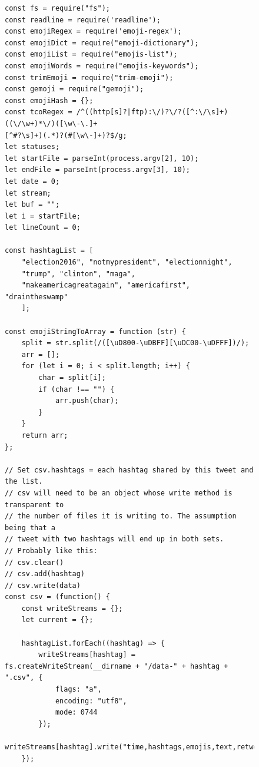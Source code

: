 \documentclass[prodmode]{acmsmall} %
\begin{document}
\begin{figure}[!t]
    \begin{lstlisting}
const fs = require("fs");
const readline = require('readline');
const emojiRegex = require('emoji-regex');
const emojiDict = require("emoji-dictionary");
const emojiList = require("emojis-list");
const emojiWords = require("emojis-keywords");
const trimEmoji = require("trim-emoji");
const gemoji = require("gemoji");
const emojiHash = {};
const tcoRegex = /^((http[s]?|ftp):\/)?\/?([^:\/\s]+)((\/\w+)*\/)([\w\-\.]+
[^#?\s]+)(.*)?(#[\w\-]+)?$/g;
let statuses;
let startFile = parseInt(process.argv[2], 10);
let endFile = parseInt(process.argv[3], 10);
let date = 0;
let stream;
let buf = "";
let i = startFile;
let lineCount = 0;

const hashtagList = [
    "election2016", "notmypresident", "electionnight",
    "trump", "clinton", "maga",
    "makeamericagreatagain", "americafirst", "draintheswamp"
    ];

const emojiStringToArray = function (str) {
    split = str.split(/([\uD800-\uDBFF][\uDC00-\uDFFF])/);
    arr = [];
    for (let i = 0; i < split.length; i++) {
        char = split[i];
        if (char !== "") {
            arr.push(char);
        }
    }
    return arr;
};

// Set csv.hashtags = each hashtag shared by this tweet and the list.
// csv will need to be an object whose write method is transparent to
// the number of files it is writing to. The assumption being that a
// tweet with two hashtags will end up in both sets.
// Probably like this:
// csv.clear()
// csv.add(hashtag)
// csv.write(data)
const csv = (function() {
    const writeStreams = {};
    let current = {};

    hashtagList.forEach((hashtag) => {
        writeStreams[hashtag] = fs.createWriteStream(__dirname + "/data-" + hashtag + ".csv", {
            flags: "a",
            encoding: "utf8",
            mode: 0744
        });
        writeStreams[hashtag].write("time,hashtags,emojis,text,retweet,bio,location\n");
    });
    
\end{lstlisting}
  \end{figure}
\end{document}
